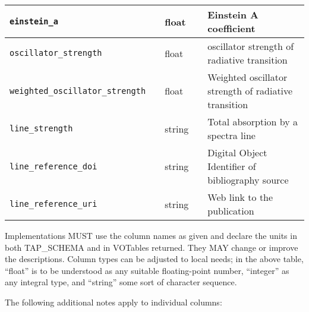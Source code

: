 \documentclass[11pt,a4paper]{ivoa}
\begin{document}
\begin{table}[H]
\begin{tabular}{|l|l|l|p{0.8cm}|p{4cm}|}
\hline
\texttt{einstein\_a} & & float  & &  Einstein A coefficient\\
\hline
\texttt{oscillator\_strength} & & float & & oscillator strength of radiative transition \\
\hline
\texttt{weighted\_oscillator\_strength} & & float  & &  Weighted oscillator strength of
radiative transition \\
\hline
\texttt{line\_strength} & & string & & Total absorption by a spectra line \\
\hline
\texttt{line\_reference\_doi} & & string & & Digital Object Identifier of bibliography source \\
\hline
\texttt{line\_reference\_uri} & & string & & Web link to the publication\\
\hline
\end{tabular}

\end{table}

Implementations MUST use the column names as given and declare the units
in both TAP\_SCHEMA and in VOTables returned.  They MAY change or improve
the descriptions.  Column types can be adjusted to local needs; in the
above table, ``float'' is to be understood as any suitable
floating-point number, ``integer'' as any integral type, and ``string''
some sort of character sequence.

The following additional notes apply to individual columns:
\end{document}
